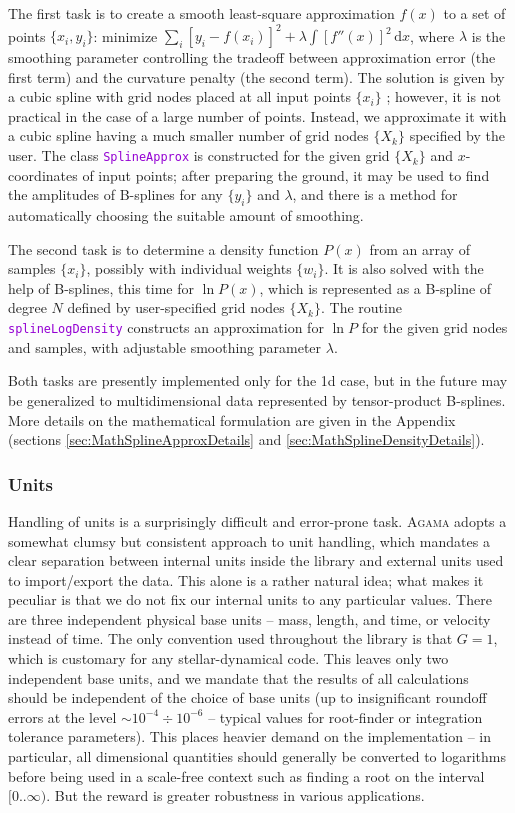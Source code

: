 \documentclass[12pt]{article}
\newcommand{\Agama}{\textsc{Agama}\xspace}
\newcommand{\ttt}[1]{\textcolor{darkviolet}{\texttt{#1}}}
\renewcommand{\d}{\mathrm{d}}
\begin{document}
The first task is to create a smooth least-square approximation $f(x)$ to a set of points $\{x_i, y_i\}$: 
minimize $\sum_i [y_i-f(x_i)]^2 + \lambda \int [f''(x)]^2\,\d x$, where $\lambda$ is the smoothing parameter controlling the tradeoff between approximation error (the first term) and the curvature penalty (the second term). The solution is given by a cubic spline with grid nodes placed at all input points $\{x_i\}$ \cite{GreenSilverman}; however, it is not practical in the case of a large number of points. Instead, we approximate it with a cubic spline having a much smaller number of grid nodes $\{X_k\}$ specified by the user. The class \ttt{SplineApprox} is constructed for the given grid  $\{X_k\}$ and $x$-coordinates of input points; after preparing the ground, it may be used to find the amplitudes of B-splines for any $\{y_i\}$ and $\lambda$, and there is a method for automatically choosing the suitable amount of smoothing.

The second task is to determine a density function $P(x)$ from an array of samples $\{x_i\}$, possibly with individual weights $\{w_i\}$. It is also solved with the help of B-splines, this time for $\ln P(x)$, which is represented as a B-spline of degree $N$ defined by user-specified grid nodes $\{X_k\}$. The routine \ttt{splineLogDensity} constructs an approximation for $\ln P$ for the given grid nodes and samples, with adjustable smoothing parameter $\lambda$.

Both tasks are presently implemented only for the 1d case, but in the future may be generalized to multidimensional data represented by tensor-product B-splines. More details on the mathematical formulation are given in the Appendix (sections \ref{sec:MathSplineApproxDetails} and \ref{sec:MathSplineDensityDetails}).


\subsubsection{Units}  \label{sec:Units}

Handling of units is a surprisingly difficult and error-prone task. \Agama adopts a somewhat clumsy but consistent approach to unit handling, which mandates a clear separation between internal units inside the library and external units used to import/export the data. This alone is a rather natural idea; what makes it peculiar is that we do not fix our internal units to any particular values. There are three independent physical base units -- mass, length, and time, or velocity instead of time. The only convention used throughout the library is that $G=1$, which is customary for any stellar-dynamical code. This leaves only two independent base units, and we mandate that the results of all calculations should be independent of the choice of base units (up to insignificant roundoff errors at the level $\sim 10^{-4}\div 10^{-6}$ -- typical values for root-finder or integration tolerance parameters). This places heavier demand on the implementation -- in particular, all dimensional quantities should generally be converted to logarithms before being used in a scale-free context such as finding a root on the interval $[0..\infty)$. But the reward is greater robustness in various applications.
\end{document}
